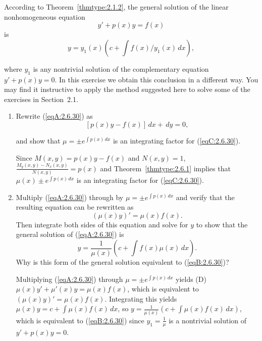 \documentclass{ximera}
\begin{document}
\begin{problem}\label{exer:2.6.30}
According to Theorem~\ref{thmtype:2.1.2}, the general solution of the linear nonhomogeneous equation
\begin{equation}\label{eqA:2.6.30}
y'+p(x)y=f(x)
\end{equation}
is
\begin{equation}\label{eqB:2.6.30}
y=y_1(x)\left(c+\int f(x)/y_1(x)\,dx\right),
\end{equation}

where $y_1$ is any nontrivial solution of the
complementary equation $y'+p(x)y=0$. In this exercise we obtain this conclusion in a different way.
You may find it instructive to apply the method suggested here
to solve some of the exercises in Section~2.1.
\begin{enumerate}
\item %
Rewrite (\ref{eqA:2.6.30}) as
\begin{equation}\label{eqC:2.6.30}
[p(x)y-f(x)]\,dx+\,dy=0,
\end{equation}

and show that $\mu=\pm e^{\int p(x)\,dx}$ is an integrating factor
for (\ref{eqC:2.6.30}).



\begin{solution}
    Since $M(x,y)=p(x)y-f(x)$  and $N(x,y)=1$,
$\frac{M_y(x,y)-N_x(x,y)}{N(x,y)}=p(x)$ and Theorem~\ref{thmtype:2.6.1}
implies that $\mu(x)\pm e^{\int p(x)\,dx}$  is an integrating factor
for (\ref{eqC:2.6.30}).
\end{solution}

\item %
Multiply (\ref{eqA:2.6.30}) through by $\mu=\pm e^{\int p(x)\,dx}$  and verify that the resulting equation can be rewritten as
$$
(\mu(x)y)'=\mu(x)f(x).
$$
Then integrate both sides of this equation and solve for $y$
to show that the general solution of (\ref{eqA:2.6.30}) is
$$
y=\frac{1}{\mu(x)}\left(c+\int f(x)\mu(x)\,dx\right).
$$
Why is this form of the general solution
 equivalent to (\ref{eqB:2.6.30})?

 

 \begin{solution}
     Multiplying (\ref{eqA:2.6.30}) through $\mu=\pm e^{\int p(x)\,dx}$
yields  (D) $\mu(x)y'+\mu'(x)y=\mu(x)f(x)$, which is equivalent to
$(\mu(x)y)'=\mu(x)f(x)$. Integrating this yields
$\mu(x)y=c+\int\mu(x)f(x)\,dx$, so
$y=\frac{1}{\mu(x)}\left(c+\int
\mu(x)f(x)\,dx\right)$, which  is equivalent to (\ref{eqB:2.6.30}) since
$y_1=\frac{1}{\mu}$ is a nontrivial solution of $y'+p(x)y=0$.
 \end{solution}
\end{enumerate}
\end{problem}
\end{document}
